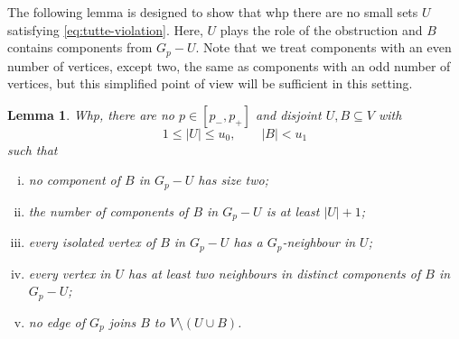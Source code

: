 \documentclass[10pt,a4paper]{article}
\newtheorem{lemma}[thm]{Lemma}
\newcommand{\cP}{\mathcal{P}}
\begin{document}
The following lemma is designed to show that whp there are no small sets $U$ satisfying \eqref{eq:tutte-violation}. Here, $U$ plays the role of the obstruction and $B$ contains components from $G_p-U$. Note that we treat components with an even number of vertices, except two, the same as components with an odd number of vertices, but this simplified point of view will be sufficient in this setting.


\begin{lemma}\label{lem:small-components-count}
Whp, there are no $p\in[p_-,p_+]$ and disjoint $U,B\subseteq V$ with
\[
1 \leq |U| \leq u_0, \qquad |B|<u_1
\]
such that
\begin{enumerate}[(i)]
\item no component of $B$ in $G_p-U$ has size two;
 \item the number of components of $B$ in $G_p-U$ is at least $|U|+1$;
 \item every isolated vertex of $B$ in $G_p-U$ has a $G_p$-neighbour in $U$;
 \item every vertex in $U$ has at least two neighbours in distinct components of $B$ in $G_p-U$;
 \item no edge of $G_p$ joins $B$ to $V\setminus(U\cup B)$.
\end{enumerate}
\end{lemma}
\end{document}
